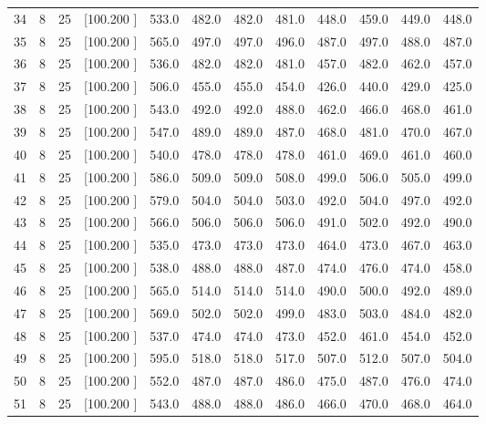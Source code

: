 \documentclass[12pt,a4paper]{article}
\begin{document}
\begin{center}
{\begin{tabular}{r r r r r r r r r r r r}
  34&  8& 25&[100.200   ]&   533.0&   482.0&   482.0&   481.0&   448.0&   459.0&   449.0&   448.0\\[-0.02in]
  35&  8& 25&[100.200   ]&   565.0&   497.0&   497.0&   496.0&   487.0&   497.0&   488.0&   487.0\\[-0.02in]
  36&  8& 25&[100.200   ]&   536.0&   482.0&   482.0&   481.0&   457.0&   482.0&   462.0&   457.0\\[-0.02in]
  37&  8& 25&[100.200   ]&   506.0&   455.0&   455.0&   454.0&   426.0&   440.0&   429.0&   425.0\\[-0.02in]
  38&  8& 25&[100.200   ]&   543.0&   492.0&   492.0&   488.0&   462.0&   466.0&   468.0&   461.0\\[-0.02in]
  39&  8& 25&[100.200   ]&   547.0&   489.0&   489.0&   487.0&   468.0&   481.0&   470.0&   467.0\\[-0.02in]
  40&  8& 25&[100.200   ]&   540.0&   478.0&   478.0&   478.0&   461.0&   469.0&   461.0&   460.0\\[-0.02in]
  41&  8& 25&[100.200   ]&   586.0&   509.0&   509.0&   508.0&   499.0&   506.0&   505.0&   499.0\\[-0.02in]
  42&  8& 25&[100.200   ]&   579.0&   504.0&   504.0&   503.0&   492.0&   504.0&   497.0&   492.0\\[-0.02in]
  43&  8& 25&[100.200   ]&   566.0&   506.0&   506.0&   506.0&   491.0&   502.0&   492.0&   490.0\\[-0.02in]
  44&  8& 25&[100.200   ]&   535.0&   473.0&   473.0&   473.0&   464.0&   473.0&   467.0&   463.0\\[-0.02in]
  45&  8& 25&[100.200   ]&   538.0&   488.0&   488.0&   487.0&   474.0&   476.0&   474.0&   458.0\\[-0.02in]
  46&  8& 25&[100.200   ]&   565.0&   514.0&   514.0&   514.0&   490.0&   500.0&   492.0&   489.0\\[-0.02in]
  47&  8& 25&[100.200   ]&   569.0&   502.0&   502.0&   499.0&   483.0&   503.0&   484.0&   482.0\\[-0.02in]
  48&  8& 25&[100.200   ]&   537.0&   474.0&   474.0&   473.0&   452.0&   461.0&   454.0&   452.0\\[-0.02in]
  49&  8& 25&[100.200   ]&   595.0&   518.0&   518.0&   517.0&   507.0&   512.0&   507.0&   504.0\\[-0.02in]
  50&  8& 25&[100.200   ]&   552.0&   487.0&   487.0&   486.0&   475.0&   487.0&   476.0&   474.0\\[-0.02in]
  51&  8& 25&[100.200   ]&   543.0&   488.0&   488.0&   486.0&   466.0&   470.0&   468.0&   464.0\\[-0.02in]

\end{tabular}}
\end{center}
\end{document}
